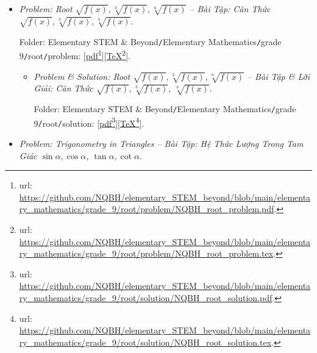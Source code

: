 \documentclass[12pt]{article}
\begin{document}
\begin{itemize}
\begin{itemize}
		Folder: {\sf Elementary STEM \& Beyond{\tt/}Elementary Mathematics{\tt/}grade 9{\tt/}1st-order inequation{\tt/}solution}: [\href{https://github.com/NQBH/elementary_STEM_beyond/blob/main/elementary_mathematics/grade_9/1st_order_inequation/solution/NQBH_1st_order_inequation_solution.pdf}{pdf}\footnote{{\sc url}: \url{https://github.com/NQBH/elementary_STEM_beyond/blob/main/elementary_mathematics/grade_9/1st_order_inequation/solution/NQBH_1st_order_inequation_solution.pdf}.}][\href{https://github.com/NQBH/elementary_STEM_beyond/blob/main/elementary_mathematics/grade_9/1st_order_inequation/solution/NQBH_1st_order_inequation_solution.tex}{\TeX}\footnote{{\sc url}: \url{https://github.com/NQBH/elementary_STEM_beyond/blob/main/elementary_mathematics/grade_9/1st_order_inequation/solution/NQBH_1st_order_inequation_solution.tex}.}].
	\end{itemize}
	\item {\it Problem: Root $\sqrt{f(x)},\sqrt[3]{f(x)},\sqrt[n]{f(x)}$ -- Bài Tập: Căn Thức $\sqrt{f(x)},\sqrt[3]{f(x)},\sqrt[n]{f(x)}$}.
	
	Folder: {\sf Elementary STEM \& Beyond{\tt/}Elementary Mathematics{\tt/}grade 9{\tt/}root{\tt/}problem}: [\href{https://github.com/NQBH/elementary_STEM_beyond/blob/main/elementary_mathematics/grade_9/root/problem/NQBH_root_problem.pdf}{pdf}\footnote{{\sc url}: \url{https://github.com/NQBH/elementary_STEM_beyond/blob/main/elementary_mathematics/grade_9/root/problem/NQBH_root_problem.pdf}.}][\href{https://github.com/NQBH/elementary_STEM_beyond/blob/main/elementary_mathematics/grade_9/root/problem/NQBH_root_problem.tex}{\TeX}\footnote{{\sc url}: \url{https://github.com/NQBH/elementary_STEM_beyond/blob/main/elementary_mathematics/grade_9/root/problem/NQBH_root_problem.tex}.}].
	\begin{itemize}
		\item {\it Problem \& Solution: Root $\sqrt{f(x)},\sqrt[3]{f(x)},\sqrt[n]{f(x)}$ -- Bài Tập \& Lời Giải: Căn Thức $\sqrt{f(x)},\sqrt[3]{f(x)}$, $\sqrt[n]{f(x)}$}.
		
		Folder: {\sf Elementary STEM \& Beyond{\tt/}Elementary Mathematics{\tt/}grade 9{\tt/}root{\tt/}solution}: [\href{https://github.com/NQBH/elementary_STEM_beyond/blob/main/elementary_mathematics/grade_9/root/solution/NQBH_root_solution.pdf}{pdf}\footnote{{\sc url}: \url{https://github.com/NQBH/elementary_STEM_beyond/blob/main/elementary_mathematics/grade_9/root/solution/NQBH_root_solution.pdf}.}][\href{https://github.com/NQBH/elementary_STEM_beyond/blob/main/elementary_mathematics/grade_9/root/solution/NQBH_root_solution.tex}{\TeX}\footnote{{\sc url}: \url{https://github.com/NQBH/elementary_STEM_beyond/blob/main/elementary_mathematics/grade_9/root/solution/NQBH_root_solution.tex}.}].
	\end{itemize}	
	\item {\it Problem: Trigonometry in Triangles -- Bài Tập: Hệ Thức Lượng Trong Tam Giác $\sin\alpha,\cos\alpha$, $\tan\alpha,\cot\alpha$}.
	

\end{itemize}
\end{document}
